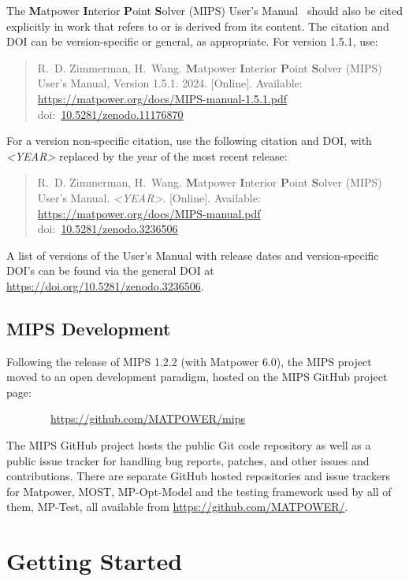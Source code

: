 \documentclass[12pt]{article}
\newcommand{\matpower}[0]{{\sc Matpower}}
\newcommand{\mptest}[0]{{MP-Test}}
\newcommand{\mips}[0]{{MIPS}}
\newcommand{\mipsurl}[0]{https://github.com/MATPOWER/mips}
\newcommand{\mipsname}[0]{{{\bf M}{\sc atpower} \textbf{I}nterior \textbf{P}oint \textbf{S}olver}}
\newcommand{\mpom}[0]{\mbox{MP-Opt-Model}}
\newcommand{\most}[0]{{MOST}}
\newcommand{\doi}[1]{doi:~\href{https://doi.org/#1}{#1}}
\numberwithin{equation}{section}
\numberwithin{table}{section}
\numberwithin{figure}{section}
\begin{document}
The \mipsname{} (\mips{}) User's Manual~\cite{mips_manual} should also be cited explicitly
in work that refers to or is derived from its content. The citation and
DOI can be version-specific or general, as appropriate. For version 1.5.1,
use:

\begin{quote}
\footnotesize
R.~D. Zimmerman, H.~Wang. \mipsname{} (\mips{}) User's Manual, Version 1.5.1. 2024. [Online]. Available: \url{https://matpower.org/docs/MIPS-manual-1.5.1.pdf}\\
\doi{10.5281/zenodo.11176870}
\end{quote}
For a version non-specific citation, use the following citation and DOI,
with \emph{\textless{}YEAR\textgreater{}} replaced by the year of the most recent release:

\begin{quote}
\footnotesize
R.~D. Zimmerman, H.~Wang. \mipsname{} (\mips{}) User's Manual. \emph{\textless{}YEAR\textgreater{}}.
[Online]. Available: \url{https://matpower.org/docs/MIPS-manual.pdf}\\
\doi{10.5281/zenodo.3236506}
\end{quote}
A list of versions of the User's Manual with release dates and
version-specific DOI's can be found via the general DOI at
\url{https://doi.org/10.5281/zenodo.3236506}.

\subsection{\mips{} Development}
\label{sec:development}

Following the release of \mips{} 1.2.2 (with \matpower{} 6.0), the \mips{} project moved to an open development paradigm, hosted on the \mips{} GitHub project page:

\bigskip

~~~~~~~~\url{\mipsurl}

\bigskip

The \mips{} GitHub project hosts the public Git code repository as well as a public issue tracker for handling bug reports, patches, and other issues and contributions. There are separate GitHub hosted repositories and issue trackers for \matpower{}, \most{}, \mpom{} and the testing framework used by all of them, \mptest{}, all available from \url{https://github.com/MATPOWER/}.


\section{Getting Started}
\end{document}
